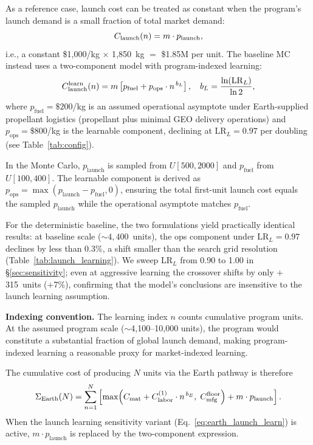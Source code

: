 \documentclass[5p,twocolumn]{elsarticle}
\begin{document}
As a reference case, launch cost can be treated as constant when the program's launch demand is a small fraction of total market demand:
\begin{equation}\small
  C_{\mathrm{launch}}(n) = m \cdot p_{\mathrm{launch}},
  \label{eq:earth_launch_baseline}
\end{equation}
i.e., a constant \$1{,}000/kg $\times$ 1{,}850~kg $=$ \$1.85M per unit. The baseline MC instead uses a two-component model with program-indexed learning:
\begin{equation}\small
  C_{\mathrm{launch}}^{\mathrm{learn}}(n) = m \left[ p_{\mathrm{fuel}} + p_{\mathrm{ops}} \cdot n^{\,b_L} \right], \quad b_L = \frac{\ln(\mathrm{LR}_L)}{\ln 2},
  \label{eq:earth_launch_learn}
\end{equation}
where $p_{\mathrm{fuel}} = \$200$/kg is an assumed operational asymptote under Earth-supplied propellant logistics (propellant plus minimal GEO delivery operations) and $p_{\mathrm{ops}} = \$800$/kg is the learnable component, declining at $\mathrm{LR}_L = 0.97$ per doubling (see Table~\ref{tab:config}).

In the Monte Carlo, $p_{\mathrm{launch}}$ is sampled from $U[500, 2000]$ and $p_{\mathrm{fuel}}$ from $U[100, 400]$. The learnable component is derived as $p_{\mathrm{ops}} = \max(p_{\mathrm{launch}} - p_{\mathrm{fuel}}, 0)$, ensuring the total first-unit launch cost equals the sampled $p_{\mathrm{launch}}$ while the operational asymptote matches $p_{\mathrm{fuel}}$.

For the deterministic baseline, the two formulations yield practically identical results: at baseline scale (${\sim}4{,}400$~units), the ops component under $\mathrm{LR}_L = 0.97$ declines by less than 0.3\%, a shift smaller than the search grid resolution (Table~\ref{tab:launch_learning}). We sweep $\mathrm{LR}_L$ from 0.90 to 1.00 in \S\ref{sec:sensitivity}; even at aggressive learning the crossover shifts by only $+$315~units ($+$7\%), confirming that the model's conclusions are insensitive to the launch learning assumption.

\textbf{Indexing convention.} The learning index $n$ counts cumulative program units. At the assumed program scale ($\sim$4{,}100--10{,}000 units), the program would constitute a substantial fraction of global launch demand, making program-indexed learning a reasonable proxy for market-indexed learning.

The cumulative cost of producing $N$ units via the Earth pathway is therefore
\begin{equation}\scriptsize
  \Sigma_{\mathrm{Earth}}(N) = \sum_{n=1}^{N} \left[ \max\!\left(C_{\mathrm{mat}} + C_{\mathrm{labor}}^{(1)} \cdot n^{\,b_E},\; C_{\mathrm{mfg}}^{\mathrm{floor}}\right) + m \cdot p_{\mathrm{launch}} \right].
  \label{eq:earth_cum}
\end{equation}
When the launch learning sensitivity variant (Eq.~\ref{eq:earth_launch_learn}) is active, $m \cdot p_{\mathrm{launch}}$ is replaced by the two-component expression.
\end{document}
